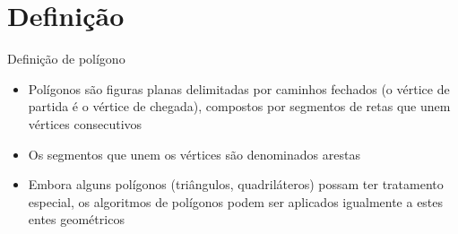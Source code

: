 \section{Definição}

\begin{frame}[fragile]{Definição de polígono}

    \begin{itemize}
        \item Polígonos são figuras planas delimitadas por caminhos fechados 
            (o vértice de partida é o vértice de chegada), compostos por segmentos de retas que 
            unem vértices consecutivos
        \pause

        \item Os segmentos que unem os vértices são denominados arestas
        \pause

        \item Embora alguns polígonos (triângulos, quadriláteros) possam ter tratamento
            especial, os algoritmos de polígonos podem ser aplicados igualmente a estes entes
            geométricos
        \pause
    \end{itemize}

    \begin{figure}
        \centering

    \end{figure}

\end{frame}

